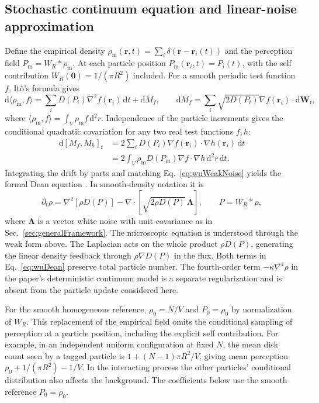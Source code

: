 \documentclass{article}
\begin{document}
\subsection{Stochastic continuum equation and linear-noise approximation}

Define the empirical density $\rho_{\mathrm m}(\mathbf r,t)=\sum_i\delta(\mathbf r-\mathbf r_i(t))$ and the perception field $P_{\mathrm m}=W_R*\rho_{\mathrm m}$. At each particle position $P_{\mathrm m}(\mathbf r_i,t)=P_i(t)$, with the self contribution $W_R(\mathbf 0)=1/(\pi R^2)$ included. For a smooth periodic test function $f$, It\^{o}'s formula gives
\begin{equation}
    \mathrm d\langle\rho_{\mathrm m},f\rangle
    =\sum_i D(P_i)\nabla^2 f(\mathbf r_i)\,\mathrm dt+\mathrm dM_f,
    \qquad
    \mathrm dM_f=\sum_i\sqrt{2D(P_i)}\nabla f(\mathbf r_i)\cdot\mathrm d\mathbf W_i,
    \label{eq:wuItoWeak}
\end{equation}
where $\langle\rho_{\mathrm m},f\rangle=\int_V\rho_{\mathrm m}f\,\mathrm d^2r$. Independence of the particle increments gives the conditional quadratic covariation for any two real test functions $f,h$:
\begin{align}
    \mathrm d[M_f,M_h]_t
    &=2\sum_i D(P_i)\nabla f(\mathbf r_i)\cdot\nabla h(\mathbf r_i)\,\mathrm dt\\
    &=2\int_V\rho_{\mathrm m}D(P_{\mathrm m})\nabla f\cdot\nabla h\,\mathrm d^2r\,\mathrm dt.
    \label{eq:wuWeakNoise}
\end{align}
Integrating the drift by parts and matching Eq.~\eqref{eq:wuWeakNoise} yields the formal Dean equation \cite{David_S_Dean_1996,Wu2026NonlocalSensing}. In smooth-density notation it is
\begin{equation}
    \partial_t\rho=\nabla^2[\rho D(P)]
    -\nabla\cdot[\sqrt{2\rho D(P)}\,\boldsymbol\Lambda],
    \qquad P=W_R*\rho,
    \label{eq:wuDean}
\end{equation}
where $\boldsymbol\Lambda$ is a vector white noise with unit covariance as in Sec.~\ref{sec:generalFramework}. The microscopic equation is understood through the weak form above. The Laplacian acts on the whole product $\rho D(P)$, generating the linear density feedback through $\rho\nabla D(P)$ in the flux. Both terms in Eq.~\eqref{eq:wuDean} preserve total particle number. The fourth-order term $-\kappa\nabla^4\rho$ in the paper's deterministic continuum model is a separate regularization and is absent from the particle update considered here.

For the smooth homogeneous reference, $\rho_0=N/V$ and $P_0=\rho_0$ by normalization of $W_R$. This replacement of the empirical field omits the conditional sampling of perception at a particle position, including the explicit self contribution. For example, in an independent uniform configuration at fixed $N$, the mean disk count seen by a tagged particle is $1+(N-1)\pi R^2/V$, giving mean perception $\rho_0+1/(\pi R^2)-1/V$. In the interacting process the other particles' conditional distribution also affects the background. The coefficients below use the smooth reference $P_0=\rho_0$.
\end{document}
